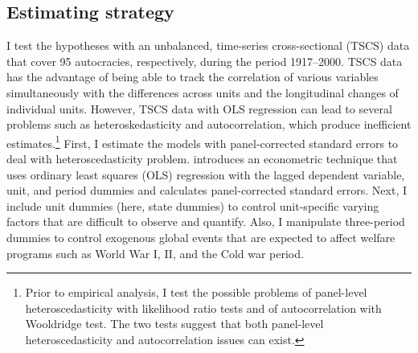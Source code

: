 \documentclass[12pt, letterpage, notitlepage]{article}
\begin{document}
\par




\subsection{Estimating strategy}

I test the hypotheses with an unbalanced, time-series cross-sectional (TSCS) data that cover 95 autocracies, respectively, during the period 1917–2000. TSCS data has the advantage of being able to track the correlation of various variables simultaneously with the differences across units and the longitudinal changes of individual units. However, TSCS data with OLS regression can lead to several problems such as heteroskedasticity and autocorrelation, which produce inefficient estimates.\footnote{Prior to empirical analysis, I test the possible problems of panel-level heteroscedasticity with likelihood ratio tests and of autocorrelation with Wooldridge test. The two tests suggest that both panel-level heteroscedasticity and autocorrelation issues can exist.} First, I estimate the models with panel-corrected standard errors to deal with heteroscedasticity problem. \citet{Beck1995} introduces an econometric technique that uses ordinary least squares (OLS) regression with the lagged dependent variable, unit, and period dummies and calculates panel-corrected standard errors. Next, I include unit dummies (here, state dummies) to control unit-specific varying factors that are difficult to observe and quantify. Also, I manipulate three-period dummies to control exogenous global events that are expected to affect welfare programs such as World War I, II, and the Cold war period.
\end{document}
